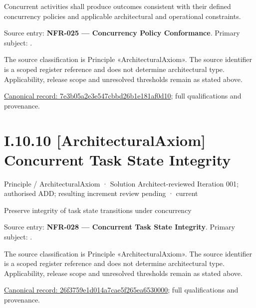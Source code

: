 Concurrent activities shall produce outcomes consistent with their defined concurrency policies and applicable architectural and operational constraints.



Source entry: \textbf{NFR-025 — Concurrency Policy Conformance}. Primary subject: \texttt{}.



The source classification is Principle «ArchitecturalAxiom». The source identifier is a scoped register reference and does not determine architectural type. Applicability, release scope and unresolved thresholds remain as stated above.


{\footnotesize \href{../../../../../../../continuum/motivation/principle/architectural-axiom/7e3b05a2e3e547cbbd26b1e181af0d10.md}{Canonical record: 7e3b05a2e3e547cbbd26b1e181af0d10}; full qualifications and provenance.}\par
\section*{I.10.10 [ArchitecturalAxiom] Concurrent Task State Integrity}
\label{navigation:I.10.10}

\label{element:26f3759e1d014a7cae5f265ea6530000}
{\small Principle / ArchitecturalAxiom · Solution Architect-reviewed Iteration 001; authorised ADD; resulting increment review pending · current}\par

Preserve integrity of task state transitions under concurrency



Source entry: \textbf{NFR-028 — Concurrent Task State Integrity}. Primary subject: \texttt{}.



The source classification is Principle «ArchitecturalAxiom». The source identifier is a scoped register reference and does not determine architectural type. Applicability, release scope and unresolved thresholds remain as stated above.


{\footnotesize \href{../../../../../../../continuum/motivation/principle/architectural-axiom/26f3759e1d014a7cae5f265ea6530000.md}{Canonical record: 26f3759e1d014a7cae5f265ea6530000}; full qualifications and provenance.}\par
